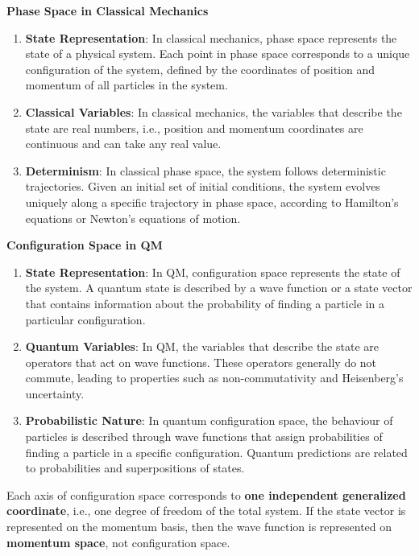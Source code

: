 \documentclass[12pt,a4paper]{report}
\newcommand{\esp}{\vspace{0.5cm}}
\begin{document}
	\esp
	
	\noindent \textbf{Phase Space in Classical Mechanics}
	
	\esp
	
	\begin{enumerate}
		\item \textbf{State Representation}: In classical mechanics, phase space represents the state of a physical system. Each point in phase space corresponds to a unique configuration of the system, defined by the coordinates of position and momentum of all particles in the system.
		\item \textbf{Classical Variables}: In classical mechanics, the variables that describe the state are real numbers, i.e., position and momentum coordinates are continuous and can take any real value.
		\item \textbf{Determinism}: In classical phase space, the system follows deterministic trajectories. Given an initial set of initial conditions, the system evolves uniquely along a specific trajectory in phase space, according to Hamilton’s equations or Newton’s equations of motion.
	\end{enumerate}
	
	\esp
	
	\noindent \textbf{Configuration Space in QM}
	
	\esp
	
	\begin{enumerate}
		\item \textbf{State Representation}: In QM, configuration space represents the state of the system. A quantum state is described by a wave function or a state vector that contains information about the probability of finding a particle in a particular configuration.
		\item \textbf{Quantum Variables}: In QM, the variables that describe the state are operators that act on wave functions. These operators generally do not commute, leading to properties such as non-commutativity and Heisenberg’s uncertainty.
		\item \textbf{Probabilistic Nature}: In quantum configuration space, the behaviour of particles is described through wave functions that assign probabilities of finding a particle in a specific configuration. Quantum predictions are related to probabilities and superpositions of states.
	\end{enumerate}
	
	\esp
	
	\begin{nota}
		Each axis of configuration space corresponds to \textbf{one independent generalized coordinate}, i.e., one degree of freedom of the total system. If the state vector is represented on the momentum basis, then the wave function is represented on \textbf{momentum space}, not configuration space.
	\end{nota}
	
\end{document}

